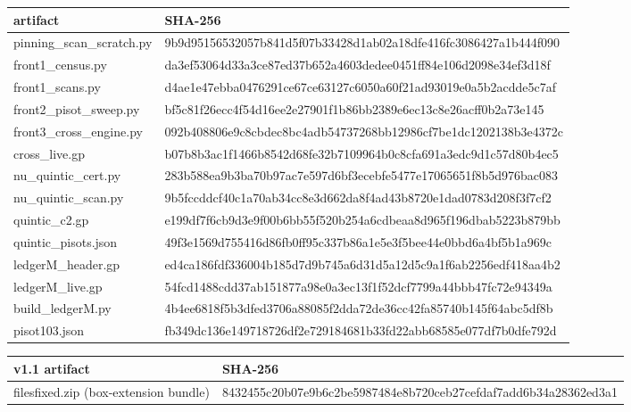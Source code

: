\documentclass[11pt]{article}
\theoremstyle{definition}
\begin{document}
\begin{center}
\scriptsize\ttfamily
\begin{tabular}{ll}
\hline
artifact & SHA-256\\
\hline
pinning\_scan\_scratch.py & 9b9d95156532057b841d5f07b33428d1ab02a18dfe416fc3086427a1b444f090\\
front1\_census.py & da3ef53064d33a3ce87ed37b652a4603dedee0451ff84e106d2098e34ef3d18f\\
front1\_scans.py & d4ae1e47ebba0476291ce67ce63127c6050a60f21ad93019e0a5b2acdde5c7af\\
front2\_pisot\_sweep.py & bf5c81f26ecc4f54d16ee2e27901f1b86bb2389e6ec13c8e26acff0b2a73e145\\
front3\_cross\_engine.py & 092b408806e9c8cbdec8bc4adb54737268bb12986cf7be1dc1202138b3e4372c\\
cross\_live.gp & b07b8b3ac1f1466b8542d68fe32b7109964b0c8cfa691a3edc9d1c57d80b4ec5\\
nu\_quintic\_cert.py & 283b588ea9b3ba70b97ac7e597d6bf3ecebfe5477e17065651f8b5d976bac083\\
nu\_quintic\_scan.py & 9b5fccddcf40c1a70ab34cc8e3d662da8f4ad43b8720e1dad0783d208f3f7cf2\\
quintic\_c2.gp & e199df7f6cb9d3e9f00b6bb55f520b254a6cdbeaa8d965f196dbab5223b879bb\\
quintic\_pisots.json & 49f3e1569d755416d86fb0ff95c337b86a1e5e3f5bee44e0bbd6a4bf5b1a969c\\
ledgerM\_header.gp & ed4ca186fdf336004b185d7d9b745a6d31d5a12d5c9a1f6ab2256edf418aa4b2\\
ledgerM\_live.gp & 54fcd1488cdd37ab151877a98e0a3ec13f1f52dcf7799a44bbb47fc72e94349a\\
build\_ledgerM.py & 4b4ee6818f5b3dfed3706a88085f2dda72de36cc42fa85740b145f64abc5df8b\\
pisot103.json & fb349dc136e149718726df2e729184681b33fd22abb68585e077df7b0dfe792d\\
\hline
\end{tabular}
\end{center}

\begin{center}
\scriptsize\ttfamily
\begin{tabular}{ll}
\hline
v1.1 artifact & SHA-256\\
\hline
filesfixed.zip (box-extension bundle) & 8432455c20b07e9b6c2be5987484e8b720ceb27cefdaf7add6b34a28362ed3a1\\
\hline
\end{tabular}
\end{center}
\end{document}
